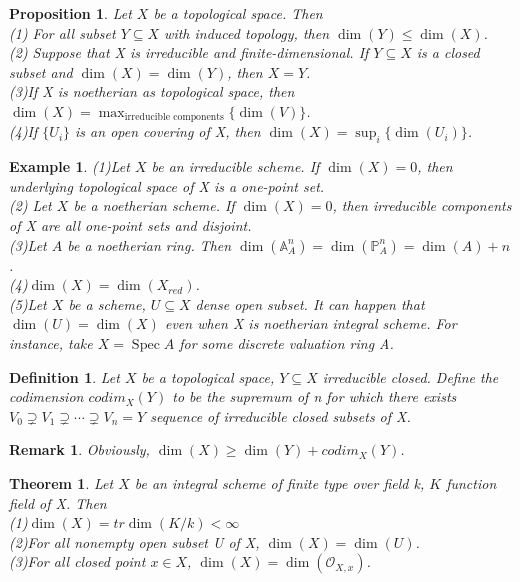 \documentclass{ctexart}
\newtheorem{definition}{Definition}[section]
\newtheorem{remark}{Remark}[section]
\newtheorem{theorem}{Theorem}[section]
\newtheorem{proposition}{Proposition}[section]
\newtheorem{example}{Example}[section]
\newcommand{\spec}{\operatorname{Spec}}
\begin{document}
\begin{proposition}
    Let $X$ be a topological space.
    Then \\
    (1) For all subset $Y \subseteq X$ with induced topology, then $\dim(Y) \le \dim(X)$. \\
    (2) Suppose that X is irreducible and finite-dimensional.
    If $Y \subseteq X$ is a closed subset and $\dim(X) = \dim(Y)$, then $X = Y$. \\
    (3)If X is noetherian as topological space, then $\dim(X) = \max_{\text{irreducible components}}\{\dim(V)\}$. \\
    (4)If $\{U_{i}\}$ is an open covering of X, then $\dim(X) = \sup_{i}\{\dim(U_{i})\}$.
    \label{Proposition 3.13}
\end{proposition}
\begin{example}
    (1)Let $X$ be an irreducible scheme.
    If $\dim(X) = 0$, then underlying topological space of X is a one-point set. \\
    (2) Let $X$ be a noetherian scheme.
    If $\dim(X) = 0$, then irreducible components of X are all one-point sets and disjoint. \\
    (3)Let $A$ be a noetherian ring.
    Then $\dim(\mathbb{A}_{A}^{n}) = \dim(\mathbb{P}_{A}^{n}) = \dim(A) + n$. \\
    (4)$\dim(X) = \dim(X_{red})$. \\
    (5)Let $X$ be a scheme, $U \subseteq X$ dense open subset.
    It can happen that $\dim(U) = \dim(X)$ even when X is noetherian integral scheme.
    For instance, take $X = \spec A$ for some discrete valuation ring A. 
\end{example}
\begin{definition}
    Let $X$ be a topological space, $Y \subseteq X$ irreducible closed.
    Define the codimension $codim_{X}(Y)$ to be the supremum of n for which there exists $V_{0} \supsetneq V_{1} \supsetneq \cdots \supsetneq V_{n} = Y$ sequence of irreducible closed subsets of X.
\end{definition}
\begin{remark}
    Obviously, $\dim(X) \ge \dim(Y) + codim_{X}(Y)$.
\end{remark}
\begin{theorem}
    Let $X$ be an integral scheme of finite type over field k, $K$ function field of X.
    Then \\
    (1)$\dim(X) = tr\dim(K/k) < \infty$ \\
    (2)For all nonempty open subset U of X, $\dim(X) = \dim(U)$. \\
    (3)For all closed point $x\in X$, $\dim(X) = \dim(\mathcal{O}_{X, x})$. 
    \label{Theorem 3.5}
\end{theorem}
\end{document}
